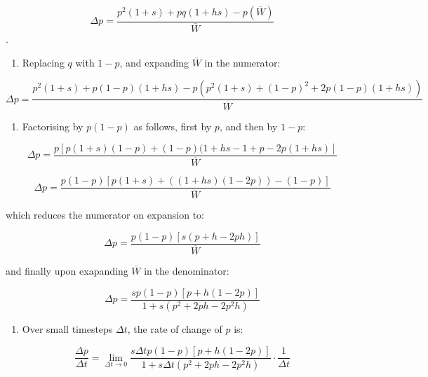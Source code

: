 \begin{equation} \Delta p = \frac{p^2(1+s) + pq(1+hs) - p(\overline{W})}{\overline{W}} \end{equation}.

\begin{enumerate}
\def\labelenumi{\arabic{enumi}.}
\setcounter{enumi}{2}
\tightlist
\item
  Replacing \(q\) with \(1-p\), and expanding \(\overline{W}\) in the
  numerator:
\end{enumerate}

\begin{equation} \Delta p = \frac{p^2(1+s) + p(1-p)(1+hs) - p(p^2(1+s) + (1-p)^2 + 2p(1-p)(1+hs))}{\overline{W}} \end{equation}

\begin{enumerate}
\def\labelenumi{\arabic{enumi}.}
\setcounter{enumi}{3}
\tightlist
\item
  Factorising by \(p(1-p)\) as follows, first by \(p\), and then by
  \(1-p\):
\end{enumerate}

\begin{equation} \Delta p = \frac{p[p(1+s)(1-p) + (1-p)(1 + hs - 1 + p - 2p(1+hs)]}{\overline{W}} \end{equation}

\begin{equation} \Delta p = \frac{p(1-p)[p(1+s) + ((1+hs)(1-2p)) - (1-p)]}{\overline{W}} \end{equation}

which reduces the numerator on expansion to:

\begin{equation} \Delta p = \frac{p(1-p)[s(p+h - 2ph)]}{\overline{W}} \end{equation}

and finally upon exapanding \(\overline{W}\) in the denominator:

\begin{equation} \Delta p = \frac{sp(1-p)[p+h(1-2p)]}{1 + s(p^2 + 2ph - 2p^2h)} \end{equation}

\begin{enumerate}
\def\labelenumi{\arabic{enumi}.}
\setcounter{enumi}{4}
\tightlist
\item
  Over small timesteps \(\Delta t\), the rate of change of \(p\) is:
\end{enumerate}

\begin{equation} \frac{\Delta p}{\Delta t} = \lim \limits_{\Delta t \to 0} \frac{s \Delta t p(1-p)[p+h(1-2p)]}{1 + s \Delta t (p^2 + 2ph - 2p^2h)} \cdot \frac{1}{\Delta t} \end{equation}

